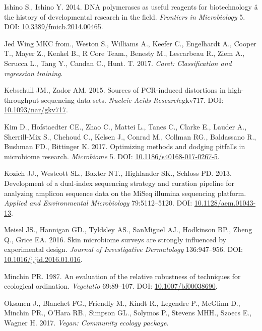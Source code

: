 \documentclass[11pt,]{article}
\begin{document}
\hypertarget{ref-polymerase_Ishino_2014}{}
Ishino S., Ishino Y. 2014. DNA polymerases as useful reagents for
biotechnology â the history of developmental research in the field.
\emph{Frontiers in Microbiology} 5. DOI:
\href{https://doi.org/10.3389/fmicb.2014.00465}{10.3389/fmicb.2014.00465}.

\hypertarget{ref-caret_citation}{}
Jed Wing MKC from., Weston S., Williams A., Keefer C., Engelhardt A.,
Cooper T., Mayer Z., Kenkel B., R Core Team., Benesty M., Lescarbeau R.,
Ziem A., Scrucca L., Tang Y., Candan C., Hunt. T. 2017. \emph{Caret:
Classification and regression training}.

\hypertarget{ref-Kebschull2015}{}
Kebschull JM., Zador AM. 2015. Sources of PCR-induced distortions in
high-throughput sequencing data sets. \emph{Nucleic Acids
Research}:gkv717. DOI:
\href{https://doi.org/10.1093/nar/gkv717}{10.1093/nar/gkv717}.

\hypertarget{ref-review_Kim_2017}{}
Kim D., Hofstaedter CE., Zhao C., Mattei L., Tanes C., Clarke E., Lauder
A., Sherrill-Mix S., Chehoud C., Kelsen J., Conrad M., Collman RG.,
Baldassano R., Bushman FD., Bittinger K. 2017. Optimizing methods and
dodging pitfalls in microbiome research. \emph{Microbiome} 5. DOI:
\href{https://doi.org/10.1186/s40168-017-0267-5}{10.1186/s40168-017-0267-5}.

\hypertarget{ref-protocol_Kozich_2013}{}
Kozich JJ., Westcott SL., Baxter NT., Highlander SK., Schloss PD. 2013.
Development of a dual-index sequencing strategy and curation pipeline
for analyzing amplicon sequence data on the MiSeq illumina sequencing
platform. \emph{Applied and Environmental Microbiology} 79:5112--5120.
DOI: \href{https://doi.org/10.1128/aem.01043-13}{10.1128/aem.01043-13}.

\hypertarget{ref-Meisel2016}{}
Meisel JS., Hannigan GD., Tyldsley AS., SanMiguel AJ., Hodkinson BP.,
Zheng Q., Grice EA. 2016. Skin microbiome surveys are strongly
influenced by experimental design. \emph{Journal of Investigative
Dermatology} 136:947--956. DOI:
\href{https://doi.org/10.1016/j.jid.2016.01.016}{10.1016/j.jid.2016.01.016}.

\hypertarget{ref-bc_index_Minchin1987}{}
Minchin PR. 1987. An evaluation of the relative robustness of techniques
for ecological ordination. \emph{Vegetatio} 69:89--107. DOI:
\href{https://doi.org/10.1007/bf00038690}{10.1007/bf00038690}.

\hypertarget{ref-vegan_citation}{}
Oksanen J., Blanchet FG., Friendly M., Kindt R., Legendre P., McGlinn
D., Minchin PR., O'Hara RB., Simpson GL., Solymos P., Stevens MHH.,
Szoecs E., Wagner H. 2017. \emph{Vegan: Community ecology package}.
\end{document}
